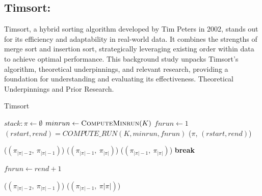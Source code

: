 \documentclass[a4paper, 9pt, twocolumn]{article}
\begin{document}
\subsection*{Timsort:}
Timsort, a hybrid sorting algorithm developed by Tim Peters in 2002, stands out for its efficiency and adaptability in real-world data. It combines the strengths of merge sort and insertion sort, strategically leveraging existing order within data to achieve optimal performance. This background study unpacks Timsort's algorithm, theoretical underpinnings, and relevant research, providing a foundation for understanding and evaluating its effectiveness.
Theoretical Underpinnings and Prior Research.\cite{peters2002}\cite{knuth1998}\cite{hulin2017performance}
\begin{algorithm}[!htb]
	\caption{Timsort}\label{alg:euclid}
	\begin{algorithmic}[1]
		\State $stack: \pi \gets \emptyset$
		\State $minrun \gets \textsc{ComputeMinrun}(K)$
		\State $fnrun \gets 1$
		\State $(rstart, rend) =  COMPUTE\_RUN(K, minrun, fnrun)$
		\State {}($\pi$, $(rstart, rend)$)

		\State {}($(\pi_{|\pi|-2},~\pi_{|\pi|-1})$)
		\Else
		\State {}($(\pi_{|\pi|-1},~\pi_{|\pi|})$)
		\EndIf
		\Else
		\State {}($(\pi_{|\pi|-1},~\pi_{|\pi|})$)
		\Else
		\State \textbf{break}
		\EndIf
		\EndIf
		\EndWhile



		\State $fnrun \gets rend + 1$
		\EndWhile

		\State {}($(\pi_{|\pi|-2},~\pi_{|\pi|-1})$)
		\Else
		\State {}($(\pi_{|\pi|-1},~\pi{|\pi|})$)
		\EndIf

		\EndWhile
		\EndFunction
	\end{algorithmic}
\end{algorithm}
\end{document}
